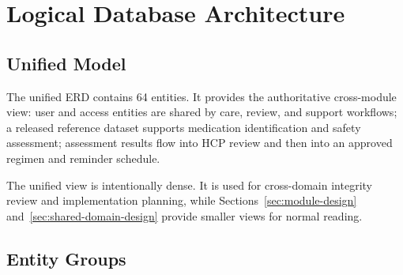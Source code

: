 \section{Logical Database Architecture}

\subsection{Unified Model}

The unified ERD contains 64 entities. It provides the authoritative cross-module view: user and access entities are shared by care, review, and support workflows; a released reference dataset supports medication identification and safety assessment; assessment results flow into HCP review and then into an approved regimen and reminder schedule.


The unified view is intentionally dense. It is used for cross-domain integrity review and implementation planning, while Sections~\ref{sec:module-design} and~\ref{sec:shared-domain-design} provide smaller views for normal reading.

\subsection{Entity Groups}

